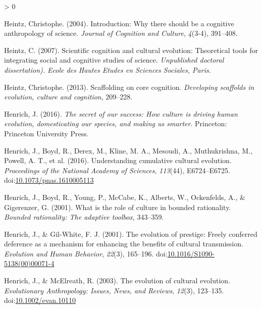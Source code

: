 \documentclass[
  11pt,
]{article}
\newlength{\cslhangindent}
\newenvironment{CSLReferences}[2] %
 {%
  \setlength{\parindent}{0pt}
  \ifodd #1 \everypar{\setlength{\hangindent}{\cslhangindent}}\ignorespaces\fi
  \ifnum #2 > 0
  \setlength{\parskip}{#2\baselineskip}
  \fi
 }%
 {}
\begin{document}
\begin{CSLReferences}{1}{0}
\leavevmode\hypertarget{ref-heintzIntroductionWhyThere2004}{}%
Heintz, Christophe. (2004). Introduction: {Why} there should be a cognitive anthropology of science. \emph{Journal of Cognition and Culture}, \emph{4}(3-4), 391--408.

\leavevmode\hypertarget{ref-heintzScientificCognitionCultural2007}{}%
Heintz, C. (2007). Scientific cognition and cultural evolution: {Theoretical} tools for integrating social and cognitive studies of science. \emph{Unpublished doctoral dissertation). Ecole des Hautes Etudes en Sciences Sociales, Paris}.

\leavevmode\hypertarget{ref-heintzScaffoldingCoreCognition2013}{}%
Heintz, Christophe. (2013). Scaffolding on core cognition. \emph{Developing scaffolds in evolution, culture and cognition}, 209--228.

\leavevmode\hypertarget{ref-henrichSecretOurSuccess2016}{}%
Henrich, J. (2016). \emph{The secret of our success: How culture is driving human evolution, domesticating our species, and making us smarter}. {Princeton}: {Princeton University Press}.

\leavevmode\hypertarget{ref-henrichUnderstandingCumulativeCultural2016}{}%
Henrich, J., Boyd, R., Derex, M., Kline, M. A., Mesoudi, A., Muthukrishna, M., Powell, A. T., et al. (2016). Understanding cumulative cultural evolution. \emph{Proceedings of the National Academy of Sciences}, \emph{113}(44), E6724--E6725. doi:\href{https://doi.org/10.1073/pnas.1610005113}{10.1073/pnas.1610005113}

\leavevmode\hypertarget{ref-henrich2001role}{}%
Henrich, J., Boyd, R., Young, P., McCabe, K., Alberts, W., Ockenfelds, A., \& Gigerenzer, G. (2001). What is the role of culture in bounded rationality. \emph{Bounded rationality: The adaptive toolbox}, 343--359.

\leavevmode\hypertarget{ref-henrichEvolutionPrestigeFreely2001}{}%
Henrich, J., \& Gil-White, F. J. (2001). The evolution of prestige: Freely conferred deference as a mechanism for enhancing the benefits of cultural transmission. \emph{Evolution and Human Behavior}, \emph{22}(3), 165--196. doi:\href{https://doi.org/10.1016/S1090-5138(00)00071-4}{10.1016/S1090-5138(00)00071-4}

\leavevmode\hypertarget{ref-henrichEvolutionCulturalEvolution2003}{}%
Henrich, J., \& McElreath, R. (2003). The evolution of cultural evolution. \emph{Evolutionary Anthropology: Issues, News, and Reviews}, \emph{12}(3), 123--135. doi:\href{https://doi.org/10.1002/evan.10110}{10.1002/evan.10110}


\end{CSLReferences}
\end{document}
